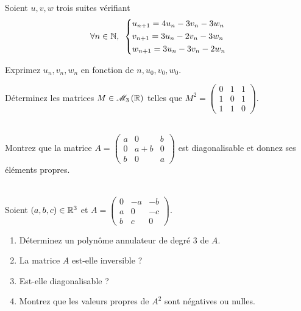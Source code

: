 \begin{corr}
\end{corr}

\begin{exo}
Soient \(u,v,w\) trois suites vérifiant \[\quantifs{\forall n\in\N}\begin{dcases}
u_{n+1}=4u_n-3v_n-3w_n \\
v_{n+1}=3u_n-2v_n-3w_n \\
w_{n+1}=3u_n-3v_n-2w_n
\end{dcases}\]

Exprimez \(u_n,v_n,w_n\) en fonction de \(n,u_0,v_0,w_0\).
\end{exo}

\begin{corr}
\end{corr}

\begin{exo}
Déterminez les matrices \(M\in\M{3}[\R]\) telles que \(M^2=\begin{pmatrix}
0 & 1 & 1 \\
1 & 0 & 1 \\
1 & 1 & 0
\end{pmatrix}\).
\end{exo}

\begin{corr}
\end{corr}

\begin{exo}~\\
Montrez que la matrice \(A=\begin{pmatrix}
a & 0 & b \\
0 & a+b & 0 \\
b & 0 & a
\end{pmatrix}\) est diagonalisable et donnez ses éléments propres.
\end{exo}

\begin{corr}
\end{corr}

\begin{exo}~\\
Soient \(\left(a,b,c\right)\in\mathbb{R}^3\) et \(A=\begin{pmatrix}
0 & -a & -b \\
a & 0 & -c \\
b & c & 0
\end{pmatrix}\).

\begin{enumerate}
    \item Déterminez un polynôme annulateur de degré \(3\) de \(A\). \\
    \item La matrice \(A\) est-elle inversible ? \\
    \item Est-elle diagonalisable ? \\
    \item Montrez que les valeurs propres de \(A^2\) sont négatives ou nulles.
\end{enumerate}
\end{exo}

